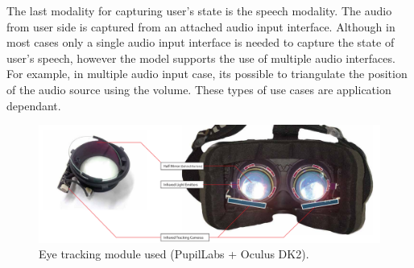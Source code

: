 The last modality for capturing user's state is the speech modality. The audio from user side is captured from an attached audio input interface. Although in most cases only a single audio input interface is needed to capture the state of user's speech, however the model supports the use of multiple audio interfaces. For example, in multiple audio input case, its possible to triangulate the position of the audio source using the volume. These types of use cases are application dependant.


\begin{figure}[t!]
\centering
\captionsetup{justification=centering} 
\includegraphics[width=1\textwidth]{figures/system/PupilTracker.pdf}
\caption{Eye tracking module used (PupilLabs + Oculus DK2).}
  \label{fig:system-pupillabs-overview}
\end{figure}




